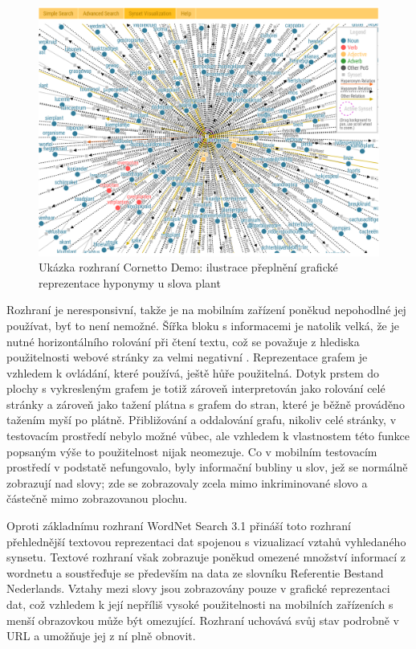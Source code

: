 \documentclass[a4paper, 11pt, oneside]{book}
\newcommand\ex{\textsf}
\begin{document}
					\begin{figure}[h]
						\centering
						\includegraphics[width=1.0\textwidth]{wncorplant.png}
						\caption{Ukázka rozhraní Cornetto Demo: ilustrace přeplnění grafické reprezentace hyponymy u slova \ex{plant}}
						\label{fig:wncorplant}
					\end{figure}

					Rozhraní je neresponsivní, takže je na mobilním zařízení poněkud nepohodlné jej používat, byť to není nemožné. Šířka bloku s informacemi je natolik velká, že je nutné horizontálního rolování při čtení textu, což se považuje z hlediska použitelnosti webové stránky za velmi negativní \parencite{nn2005scrollbar, richards2004web}. Reprezentace grafem je vzhledem k ovládání, které používá, ještě hůře použitelná. Dotyk prstem do plochy s vykresleným grafem je totiž zároveň interpretován jako rolování celé stránky a zároveň jako tažení plátna s grafem do stran, které je běžně prováděno tažením myší po plátně. Přibližování a oddalování grafu, nikoliv celé stránky, v testovacím prostředí nebylo možné vůbec, ale vzhledem k vlastnostem této funkce popsaným výše to použitelnost nijak neomezuje. Co v mobilním testovacím prostředí v podstatě nefungovalo, byly informační bubliny u slov, jež se normálně zobrazují nad slovy; zde se zobrazovaly zcela mimo inkriminované slovo a částečně mimo zobrazovanou plochu.

					Oproti základnímu rozhraní WordNet Search 3.1 přináší toto rozhraní přehlednější textovou reprezentaci dat spojenou s vizualizací vztahů vyhledaného synsetu. Textové rozhraní však zobrazuje poněkud omezené množství informací z wordnetu a soustřeďuje se především na data ze slovníku Referentie Bestand Nederlands. Vztahy mezi slovy jsou zobrazovány pouze v grafické reprezentaci dat, což vzhledem k její nepříliš vysoké použitelnosti na mobilních zařízeních s menší obrazovkou může být omezující. Rozhraní uchovává svůj stav podrobně v URL a umožňuje jej z ní plně obnovit.
\end{document}
